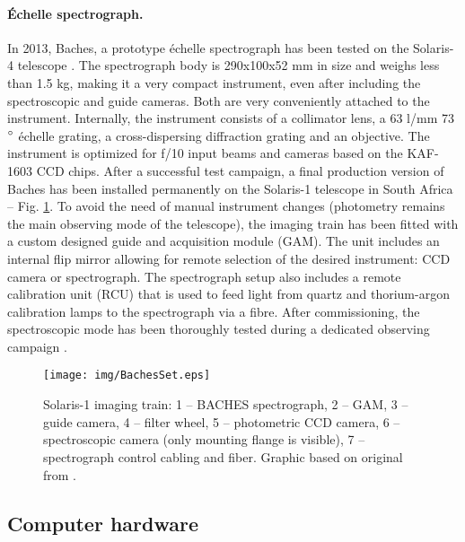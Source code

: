 \paragraph{\'Echelle spectrograph.}

In 2013, Baches, a prototype \'echelle spectrograph has been tested on the Solaris-4 telescope \citep{Kozlowski2014}. The spectrograph body is 290x100x52 mm in size and weighs less than 1.5 kg, making it a very compact instrument, even after including the spectroscopic and guide cameras. Both are very conveniently attached to the instrument.  Internally, the instrument consists of a collimator lens, a 63 l/mm 73$\degree$ \'echelle grating, a cross-dispersing diffraction grating and an objective. The instrument is optimized for f/10 input beams and cameras based on the KAF-1603 CCD chips. After a successful test campaign, a final production version of Baches has been installed permanently on the Solaris-1 telescope in South Africa -- Fig. \ref{fig:BachesSet}. To avoid the need of manual instrument changes (photometry remains the main observing mode of the telescope), the imaging train has been fitted with a custom designed guide and acquisition module (GAM). The unit includes an internal flip mirror allowing for remote selection of the desired instrument: CCD camera or spectrograph. The spectrograph setup also includes a remote calibration unit (RCU) that is used to feed light from quartz and thorium-argon calibration lamps to the spectrograph via a fibre. After commissioning, the spectroscopic mode has been thoroughly tested during a dedicated observing campaign \citep{Kozlowski2016}.

\begin{figure}[htb!]
\begin{center}
\texttt{[image: img/BachesSet.eps]}
\caption{Solaris-1 imaging train: 1 -- BACHES spectrograph, 2 -- GAM, 3 -- guide camera, 4 -- filter wheel, 5 -- photometric CCD camera, 6 -- spectroscopic camera (only mounting flange is visible), 7 -- spectrograph control cabling and fiber. Graphic based on original from  \cite{Kozlowski2014}.}
\label{fig:BachesSet}
\end{center}
\end{figure}

\label{sec:spectrograph}

\subsection{Computer hardware}
\label{ssec:ComputerHardware}

